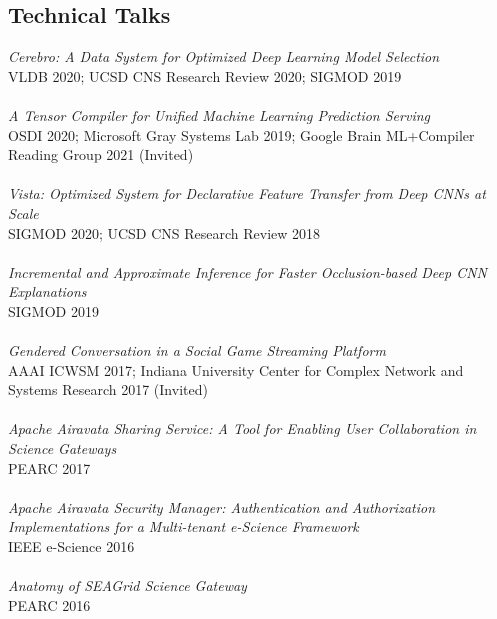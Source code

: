 \documentclass[margin]{res}
\begin{document}
\begin{resume}
\section{Technical Talks}
\textit{Cerebro: A Data System for Optimized Deep Learning Model Selection}\\ VLDB 2020; UCSD CNS Research Review 2020; SIGMOD 2019\\\\
\textit{A Tensor Compiler for Unified Machine Learning Prediction Serving}\\ OSDI 2020; Microsoft Gray Systems Lab 2019; Google Brain ML+Compiler Reading Group 2021 (Invited)\\\\
\textit{Vista: Optimized System for Declarative Feature Transfer from Deep CNNs at Scale}\\ SIGMOD 2020; UCSD CNS Research Review 2018\\\\
\textit{Incremental and Approximate Inference for Faster Occlusion-based Deep CNN Explanations}\\ SIGMOD 2019\\\\
\textit{Gendered Conversation in a Social Game Streaming Platform}\\ AAAI ICWSM 2017; Indiana University Center for Complex Network and Systems Research 2017 (Invited) \\\\
\textit{Apache Airavata Sharing Service: A Tool for Enabling User Collaboration in Science Gateways}\\ PEARC 2017 \\\\
\textit{Apache Airavata Security Manager: Authentication and Authorization Implementations for a Multi-tenant e-Science Framework}\\ IEEE e-Science 2016 \\\\
\textit{Anatomy of SEAGrid Science Gateway}\\ PEARC 2016 \\\\


\end{resume}
\end{document}
